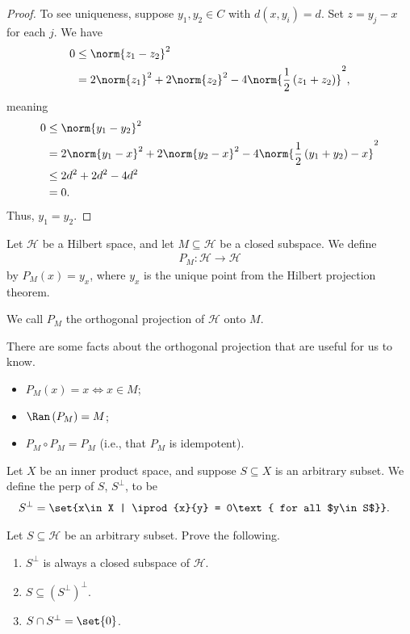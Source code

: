 \documentclass[10pt]{mypackage}
\begin{document}
\begin{proof}
  To see uniqueness, suppose $y_1,y_2\in C$ with $d\left(x,y_i\right) = d$. Set $z = y_j - x$ for each $j$. We have
  \begin{align*}
    0 &\leq \norm{z_1 - z_2}^2\\
      &= 2\norm{z_1}^2 + 2\norm{z_2}^2 - 4\norm{\frac{1}{2}\left(z_1 + z_2\right)}^2,
  \end{align*}
  meaning
  \begin{align*}
    0 &\leq \norm{y_1 - y_2}^2\\
      &= 2\norm{y_1 - x}^2 + 2\norm{y_2 - x}^2 - 4\norm{\frac{1}{2}\left(y_1 + y_2\right) - x}^2\\
      &\leq 2d^2 + 2d^2 - 4d^2\\
      &= 0.
  \end{align*}
  Thus, $y_1 = y_2$.
\end{proof}
\begin{definition}
  Let $\mathcal{H}$ be a Hilbert space, and let $M\subseteq \mathcal{H}$ be a closed subspace. We define
  \begin{align*}
    P_M: \mathcal{H}\rightarrow \mathcal{H}
  \end{align*}
  by $P_M\left(x\right) = y_x$, where $y_x$ is the unique point from the Hilbert projection theorem.\newline

  We call $P_M$ the orthogonal projection of $\mathcal{H}$ onto $M$.
\end{definition}
\begin{fact}
  There are some facts about the orthogonal projection that are useful for us to know.
  \begin{itemize}
    \item $P_M(x) = x \Leftrightarrow x\in M$;
    \item $\Ran\left(P_M\right) = M$;
    \item $P_M \circ P_M = P_M$ (i.e., that $P_M$ is idempotent).
  \end{itemize}
\end{fact}
\begin{definition}
  Let $X$ be an inner product space, and suppose $S\subseteq X$ is an arbitrary subset. We define the perp of $S$, $S^{\perp}$, to be
  \begin{align*}
    S^{\perp} &= \set{x\in X | \iprod{x}{y} = 0\text{ for all $y\in S$}}.
  \end{align*}
  
\end{definition}
\begin{exercise}
  Let $S\subseteq \mathcal{H}$ be an arbitrary subset. Prove the following.
  \begin{enumerate}[(1)]
    \item $S^{\perp}$ is always a closed subspace of $\mathcal{H}$.
    \item $S\subseteq \left(S^{\perp}\right)^{\perp}$.
    \item $S\cap S^{\perp} = \set{0}$.
  \end{enumerate}
\end{exercise}
\end{document}
